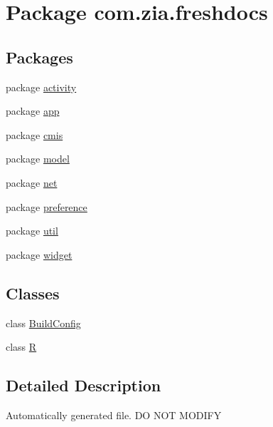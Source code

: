 \hypertarget{namespacecom_1_1zia_1_1freshdocs}{\section{Package com.\-zia.\-freshdocs}
\label{namespacecom_1_1zia_1_1freshdocs}
}
\subsection*{Packages}
\begin{DoxyCompactItemize}
\item 
package \hyperlink{namespacecom_1_1zia_1_1freshdocs_1_1activity}{activity}
\item 
package \hyperlink{namespacecom_1_1zia_1_1freshdocs_1_1app}{app}
\item 
package \hyperlink{namespacecom_1_1zia_1_1freshdocs_1_1cmis}{cmis}
\item 
package \hyperlink{namespacecom_1_1zia_1_1freshdocs_1_1model}{model}
\item 
package \hyperlink{namespacecom_1_1zia_1_1freshdocs_1_1net}{net}
\item 
package \hyperlink{namespacecom_1_1zia_1_1freshdocs_1_1preference}{preference}
\item 
package \hyperlink{namespacecom_1_1zia_1_1freshdocs_1_1util}{util}
\item 
package \hyperlink{namespacecom_1_1zia_1_1freshdocs_1_1widget}{widget}
\end{DoxyCompactItemize}
\subsection*{Classes}
\begin{DoxyCompactItemize}
\item 
class \hyperlink{classcom_1_1zia_1_1freshdocs_1_1_build_config}{Build\-Config}
\item 
class \hyperlink{classcom_1_1zia_1_1freshdocs_1_1_r}{R}
\end{DoxyCompactItemize}


\subsection{Detailed Description}
Automatically generated file. D\-O N\-O\-T M\-O\-D\-I\-F\-Y 
